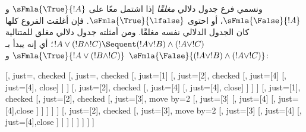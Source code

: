 \documentclass[../../../include/open-logic-section]{subfiles}
\begin{document}
ونسمي فرع جدول دلالي \emph{مغلقًا} إذا اشتمل معًا على
$\sFmla{\True}{!A}$ و$\sFmla{\False}{!A}$، أو احتوى
$\sFmla{\True}{\lfalse}$. فإن أغلقت الفروع كلها كان الجدول الدلالي نفسه
مغلقًا. ومن أمثلته جدول دلالي مغلق للمتتالية
$!A\lor(!B\land !C)\Sequent(!A\lor !B)\land(!A\lor !C)$؛ أي إنه يبدأ بـ
$\sFmla{\True}{!A\lor(!B\land !C)}$ و
$\sFmla{\False}{(!A\lor !B)\land(!A\lor !C)}$:
\begin{maxwidth}
\begin{tableau}{}
  [,
    just=\TAss, checked
    [, just=\TAss, checked
      [, just={\TRule{\True}{\lor}[1]}
        [,
          just={\TRule{\False}{\land}[2]}, checked
          [,
            just={\TRule{\False}{\lor}[4]}
            [,
              just={\TRule{\False}{\lor}[4]}, close]
          ]
        ]
        [,
          just={\TRule{\False}{\land}[2]}, checked
          [,
            just={\TRule{\False}{\lor}[4]}
            [,
              just={\TRule{\False}{\lor}[4]}, close]
          ]
        ]
      ]
      [,
        just={\TRule{\True}{\lor}[1]}, checked
        [,
          just={\TRule{\False}{\land}[2]}, checked
          [,
            just={\TRule{\True}{\land}[3]}, move by=2
            [,
              just={\TRule{\True}{\land}[3]}
              [,
                just={\TRule{\False}{\lor}[4]}
                [,
                  just={\TRule{\False}{\lor}[4]},close
                ]
              ]
            ]
          ]
        ]
        [,
          just={\TRule{\False}{\land}[2]}, checked
          [,
            just={\TRule{\True}{\land}[3]}, move by=2
              [,
                just={\TRule{\True}{\land}[3]}
                [,
                  just={\TRule{\False}{\lor}[4]}
                  [,
                  just={\TRule{\False}{\lor}[4]},close
                ]
              ]
            ]
          ]
        ]
      ]
    ]
  ]
\end{tableau}
\end{maxwidth}
\end{document}
